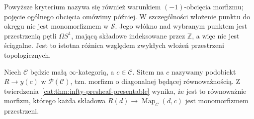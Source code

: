 Powyższe kryterium nazywa się również warunkiem $(-1)$-obcięcia morfizmu; pojęcie ogólnego obcięcia omówimy później. W szczególności włożenie punktu do okręgu nie jest monomorfizmem w $\mathcal S$. Jego włókno nad wybranym punktem jest przestrzenią pętli $\Omega S^1$, mającą składowe indeksowane przez $\mathbb Z$, a więc nie jest ściągalne. Jest to istotna różnica względem zwykłych włożeń przestrzeni topologicznych.

\begin{definicja}\label{cat:def:infty-sieve}
Niech $\mathcal C$ będzie małą $\infty$-kategorią, a $c\in\mathcal C$. Sitem na $c$ nazywamy podobiekt $R\to y(c)$ w $\mathcal P(\mathcal C)$, tzn. morfizm o diagonalnej będącej równoważnością. Z twierdzenia~\ref{cat:thm:infty-presheaf-presentable} wynika, że jest to równoważnie morfizm, którego każda składowa $R(d)\to\operatorname{Map}_{\mathcal C}(d,c)$ jest monomorfizmem przestrzeni.
\end{definicja}

